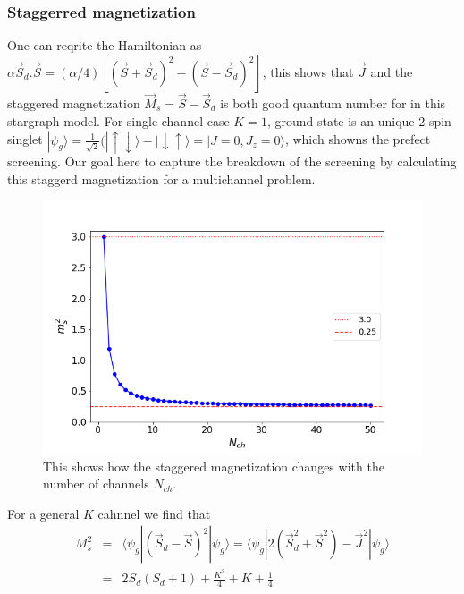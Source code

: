 \documentclass[reprint,prb,superscriptaddress]{revtex4-1}
\begin{document}
\subsubsection{Staggerred magnetization}
\noindent  One can reqrite the Hamiltonian as $\alpha \vec{S}_d.\vec{S}=(\alpha/4) [( \vec{S}+\vec{S}_d)^2-( \vec{S}-\vec{S}_d)^2]$, this shows that $\vec{J}$ and the staggered magnetization $\vec{M}_s=\vec{S}-\vec{S}_d$ is both good quantum number for in this stargraph model. For single channel case $K=1$, ground state is an unique 2-spin singlet $|\psi_g\rangle =\frac{1}{\sqrt{2}} (|\uparrow\downarrow\rangle-|\downarrow\uparrow\rangle = |J=0,J_z=0\rangle$, which showns the prefect screening. Our goal here to capture the breakdown of the screening by calculating this staggerd magnetization for a multichannel problem. 
\begin{figure}
\includegraphics[scale=0.36]{plt/Staggered_mag_50.png}
\caption{This shows how the staggered magnetization changes with the number of channels $N_{ch}$.}
\label{fig:st_mag}
\end{figure}
%
%
%
For a general $K$ cahnnel we find that 
\begin{eqnarray}
M_s^2 &=& \langle \psi_g | (\vec{S}_d - \vec{S})^2 |\psi_g\rangle = \langle \psi_g | 2(\vec{S}_d^2 + \vec{S}^2)-\vec{J}^2 |\psi_g\rangle \nonumber\\
&=& 2S_d(S_d+1) +\frac{K^2}{4} + K +\frac{1}{4}
\end{eqnarray}
\end{document}
